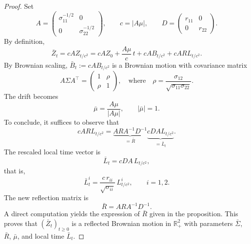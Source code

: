 \documentclass[10pt,a4paper]{amsart}
\begin{document}
\begin{proof}
Set
\[
A=\begin{pmatrix}
\sigma_{11}^{-1/2} & 0\\
0 & \sigma_{22}^{-1/2}
\end{pmatrix},
\qquad
c=|A\mu|,
\qquad
D=\begin{pmatrix}
r_{11} & 0\\
0 & r_{22}
\end{pmatrix}.
\]
By definition,
\[
\bar Z_t
=cA Z_{t/c^2}=
cAZ_0+\frac{A\mu}{c}\,t+cA B_{t/c^2}+cA R L_{t/c^2}.
\]
By Brownian scaling, \(\bar B_t := cA B_{t/c^2}\) is a Brownian motion with covariance matrix
\[
A\Sigma A^\top
=
\begin{pmatrix}
1 & \rho\\
\rho & 1
\end{pmatrix},
\quad\text{where}\quad
\rho=\frac{\sigma_{12}}{\sqrt{\sigma_{11}\sigma_{22}}}.
\]
The drift becomes
\[
\bar\mu=\frac{A\mu}{|A\mu|}, \qquad |\bar\mu|=1.
\]
To conclude, it suffices to observe that
\[
cA R L_{t/c^2}
=
\underbrace{A R A^{-1}D^{-1}}_{=\bar R}
\underbrace{c D A L_{t/c^2}}_{=\bar L_t}.
\]
The rescaled local time vector is
\[
\bar L_t
=
cD A\, L_{t/c^2},
\]
that is,
\[
\bar L_t^i=\frac{c\, r_{ii}}{\sqrt{\sigma_{ii}}}\,L_{t/c^2}^i,
\qquad i=1,2.
\]
The new reflection matrix is
\[
\bar R=AR A^{-1}D^{-1}.
\]
A direct computation yields the expression of $\bar R$ given in the proposition.
This proves that \((\bar Z_t)_{t\ge0}\) is a reflected Brownian motion in \(\mathbb{R}_+^2\) with parameters \(\bar\Sigma\), \(\bar R\), \(\bar\mu\), and local time \(\bar L_t\).
\end{proof}
\end{document}
